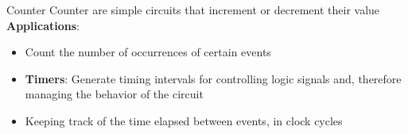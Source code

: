\begin{parag}{Counter}
    Counter are simple circuits that increment or decrement their value\\
    \textbf{Applications}:
    \begin{itemize}
        \item Count the number of occurrences of certain events 
        \item  \textbf{Timers}: Generate timing intervals for controlling logic signals and, therefore managing the behavior of the circuit
        \item Keeping track of the time elapsed between events, in clock cycles
    \end{itemize}
    
    
\end{parag}



